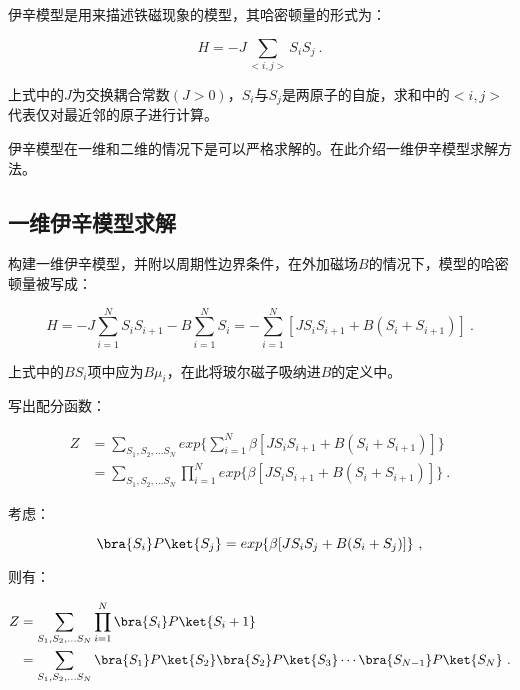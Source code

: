 
\begin{issues}
\issueDraft
\issueMissDepend
{}
\end{issues}



伊辛模型是用来描述铁磁现象的模型，其哈密顿量的形式为：

\begin{equation}
H=-J\sum\limits_{<i,j>}S_iS_j~.
\end{equation}

上式中的$J$为交换耦合常数$(J>0)$，$S_i$与$S_j$是两原子的自旋，求和中的$<i,j>$代表仅对最近邻的原子进行计算。

伊辛模型在一维和二维的情况下是可以严格求解的。在此介绍一维伊辛模型求解方法。

\subsection{一维伊辛模型求解}

构建一维伊辛模型，并附以周期性边界条件，在外加磁场$B$的情况下，模型的哈密顿量被写成：

\begin{equation}
H=-J\sum\limits_{i=1}^NS_iS_{i+1}-B\sum\limits_{i=1}^NS_i=-\sum\limits_{i=1}^N[JS_iS_{i+1}+B(S_i+S_{i+1})]~.
\end{equation}

上式中的$BS_i$项中应为$B\mu_i$，在此将玻尔磁子吸纳进$B$的定义中。

写出配分函数：

\begin{align}
Z&=\sum\limits_{S_1,S_2,...S_N}exp\{\sum\limits_{i=1}^N\beta[JS_iS_{i+1}+B(S_i+S_{i+1})]\} \\
&=\sum\limits_{S_1,S_2,...S_N}\prod\limits_{i=1}^N exp\{\beta[JS_iS_{i+1}+B(S_i+S_{i+1})]\}~.
\end{align}

考虑：

\begin{equation}
\bra{S_i}P\ket{S_j}=exp\{\beta[JS_iS_{j}+B(S_i+S_{j})]\}~,
\end{equation}

则有：

\begin{align}
Z&=\sum\limits_{S_1,S_2,...S_N}\prod\limits_{i=1}^N\bra{S_i}P\ket{S_i+1} \\
&=\sum\limits_{S_1,S_2,...S_N}\bra{S_1}P\ket{S_2} \bra{S_2}P\ket{S_3}\cdots\bra{S_{N-1}}P\ket{S_N} ~.
\end{align}

